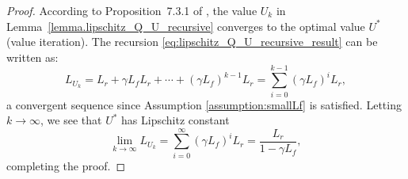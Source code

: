 \documentclass[11pt, notitlepage]{article}
\newcommand{\1}{\mathbbm{1}}
\begin{document}
\begin{proof} According to Proposition~7.3.1 of \citet{bertsekas2012dynamic}, the value $U_k$ in Lemma~\ref{lemma.lipschitz_Q_U_recursive} converges to the optimal value $U^*$ (value iteration). The recursion \eqref{eq:lipschitz_Q_U_recursive_result} can be written as:
\[
L_{U_k} = L_r + \gamma L_f L_r + \cdots +  (\gamma L_f)^{k-1} L_r =  \sum_{i=0}^{k-1} (\gamma L_f)^i L_r,
\]
a convergent sequence since Assumption \ref{assumption:smallLf} is satisfied. Letting $k\rightarrow \infty$, we see that $U^*$ has Lipschitz constant 
\[
\lim_{k\rightarrow\infty} L_{U_k} = \sum_{i=0}^{\infty} (\gamma L_f)^i L_r = \frac{L_r}{1 - \gamma L_f},
\]
completing the proof.
\end{proof}


    




















    
    
    




























    
\end{document}
